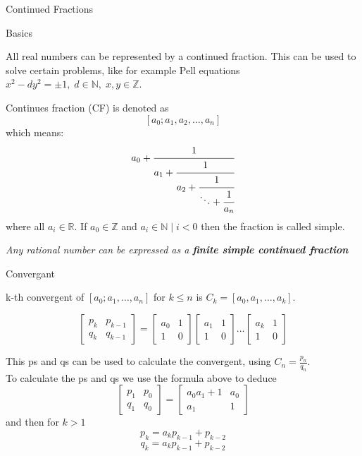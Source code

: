 \documentclass[12pt, letterpaper]{article}
\begin{document}
\begin{section}{Continued Fractions}

  \begin{subsection}{Basics}

    All real numbers can be represented by a continued fraction. This can be
    used to solve certain problems, like for example Pell equations
    \(x^{2} - dy^{2} = \pm 1, \; d \in \mathbb{N}, \; x, y \in \mathbb{Z}\).

    Continues fraction (CF) is denoted as \[[a_{0}; a_{1}, a_{2}, \dots , a_{n}]\]
    which means:
    \[a_{0} + \cfrac{1}{a_{1} + \cfrac{1}{a_{2} + \cfrac{1}{\ddots + \cfrac{1}{a_{n}}
          }}}\]
    where all \(a_{i} \in \mathbb{R}\). If \(a_{0} \in \mathbb{Z}\) and
    \(a_{i} \in \mathbb{N} \;|\; i < 0\) then the fraction is called simple.

    \emph{Any rational number can be expressed as a \textbf{finite simple continued fraction}}

  \end{subsection}

  \begin{subsection}{Convergant}

    k-th convergent of \([a_{0}; a_{1}, \dots , a_{n}]\) for \(k \leq n\) is
    \(C_{k} = [a_{0}, a_{1}, \dots , a_{k}]\).

    \[
      \begin{bmatrix}
        p_{k} & p_{k - 1} \\
        q_{k} & q_{k - 1}
      \end{bmatrix} =
      \begin{bmatrix}
        a_{0} & 1 \\
        1 & 0
      \end{bmatrix}
      \begin{bmatrix}
        a_{1} & 1 \\
        1 & 0
      \end{bmatrix}
      \dots
      \begin{bmatrix}
        a_{k} & 1 \\
        1 & 0
      \end{bmatrix}
    \]

    This ps and qs can be used to calculate the convergent, using
    \(C_{n} = \frac{p_{n}}{q_{n}}\). \\
    To calculate the ps and qs we use the formula above to deduce
    \[
      \begin{bmatrix}
        p_{1} & p_{0} \\
        q_{1} & q_{0}
      \end{bmatrix} =
      \begin{bmatrix}
        a_{0}a_{1} + 1 & a_{0} \\
        a_{1} & 1
      \end{bmatrix}
    \]
    and then for \(k > 1\)
    \[p_{k} = a_{k}p_{k - 1} + p_{k - 2}\]\[q_{k} = a_{k}p_{k - 1} + p_{k - 2}\]


\end{subsection}
\end{section}
\end{document}
